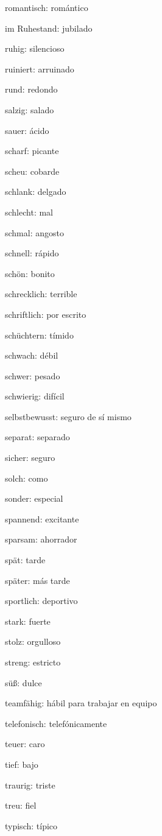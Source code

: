 \begin{multicols}{2}
\begin{myitemize}
\item romantisch: romántico
\item im Ruhestand: jubilado
\item ruhig: silencioso
\item ruiniert: arruinado
\item rund: redondo
\item salzig: salado
\item sauer: ácido
\item scharf: picante
\item scheu: cobarde
\item schlank: delgado
\item schlecht: mal
\item schmal: angosto
\item schnell: rápido
\item schön: bonito
\item schrecklich: terrible
\item schriftlich: por escrito
\item schüchtern: tímido
\item schwach: débil
\item schwer: pesado
\item schwierig: difícil
\item selbstbewusst: seguro de sí mismo
\item separat: separado
\item sicher: seguro
\item solch: como
\item sonder: especial
\item spannend: excitante
\item sparsam: ahorrador
\item spät: tarde
\item später: más tarde
\item sportlich: deportivo
\item stark: fuerte
\item stolz: orgulloso
\item streng: estricto
\item süß: dulce
\item teamfähig: hábil para trabajar en equipo
\item telefonisch: telefónicamente
\item teuer: caro
\item tief: bajo
\item traurig: triste
\item treu: fiel
\item typisch: típico

\end{myitemize}
\end{multicols}
